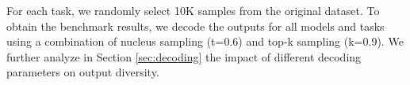 \documentclass[11pt,a4paper]{article}
\begin{document}




For each task, we randomly select 10K samples from the original dataset. To obtain the benchmark results, we decode the outputs for all models and tasks using a combination of nucleus sampling (t=0.6) and top-k sampling (k=0.9). We further analyze in Section \ref{sec:decoding} the impact of different decoding parameters on output diversity.
\end{document}
